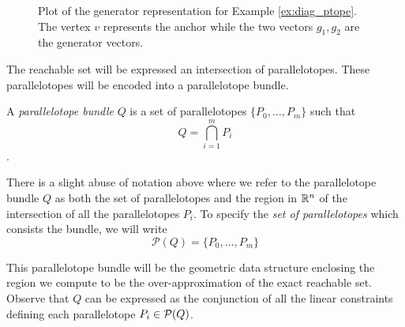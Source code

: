 \begin{figure}[h!]
  \centering
  \caption{Plot of the generator representation for Example \ref{ex:diag_ptope}. The vertex $v$ represents the anchor while the two vectors $g_1,g_2$ are the generator vectors.}
  \label{fig:diag_ptope}
\end{figure}

%
The reachable set will be expressed an intersection of parallelotopes. These parallelotopes will be encoded into a parallelotope bundle.
%
\begin{definition}
A \emph{parallelotope bundle} $Q$ is a set of parallelotopes $\{P_0, \ldots, P_m\}$ such that
  $$ Q = \bigcap_{i=1}^{m}P_i $$.
\end{definition}

\begin{remark}
There is a slight abuse of notation above where we refer to the parallelotope bundle $Q$ as both the set of parallelotopes and the region in ${\mathbb{R}}^n$ of the intersection of all the parallelotopes $P_i$. To specify the \emph{set of parallelotopes} which consists the bundle, we will write
$$
\mathcal{P}(Q) = \{P_0, \ldots, P_m\}
$$
\end{remark}

%
\noindent This parallelotope bundle will be the geometric data structure enclosing the region we compute to be the over-approximation of the exact reachable set. Observe that $Q$ can be expressed as the conjunction of all the linear constraints defining each parallelotope $P_i \in \mathcal{P}(Q)$.

\newpage
